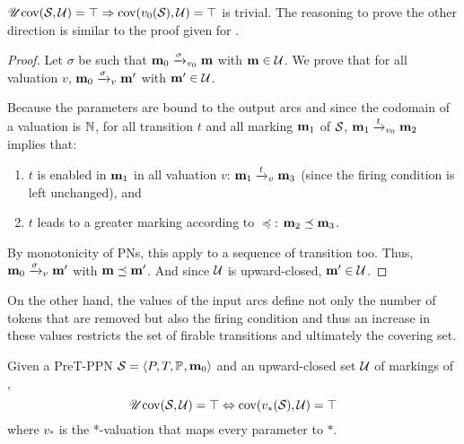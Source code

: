 \(\UcovOp(\namePPN, \ucs) = \top \Rightarrow \cov{v_0(\namePPN)}{\ucs} = \top\) is trivial.
The reasoning to prove the other direction is similar to the proof given for .

\begin{proof}
  Let $\sigma$ be such that $\mari \fire[\val_0]{\sigma} \mar$ with $\mar \in \ucs$.
  We prove that for all valuation $v$, $\mari \fire[v]{\sigma} \marp$ with $\marp \in \ucs$.

  Because the parameters are bound to the output arcs and since the codomain of a valuation is $\naturals$, for all transition $t$ and all marking $\mar_1$ of $\namePPN$, $\mar_1 \fire[v_0]{t} \mar_2$ implies that:
  \begin{enumerate}
    \item $t$ is enabled in $\mar_1$ in all valuation $v$: $\mar_1 \fire[v]{t} \mar_3$ (since the firing condition is left unchanged), and
    \item $t$ leads to a greater marking according to $\preceq$: $\mar_2 \preceq \mar_3$.
  \end{enumerate}

  By monotonicity of \acp{PN}, this apply to a sequence of transition too.
  Thus, $\mari \fire[v]{\sigma} \marp$ with $\mar \preceq \mar'$.
  And since $\ucs$ is upward-closed, $\marp \in \ucs$.
\end{proof}

On the other hand, the values of the input arcs define not only the number of tokens that are removed but also the firing condition and thus an increase in these values restricts the set of firable transitions and ultimately the covering set.

\begin{lemm}
  \label{theo:pre-u-star-val}
  Given a PreT-\ac{PPN} $\defPPN$ and an upward-closed set $\ucs$ of markings of \namePPN, \[\UcovOp(\namePPN, \ucs) = \top \Leftrightarrow \cov{v_*(\namePPN)}{\ucs} = \top\] where $v_*$ is the *-valuation that maps every parameter to $*$.
\end{lemm}

